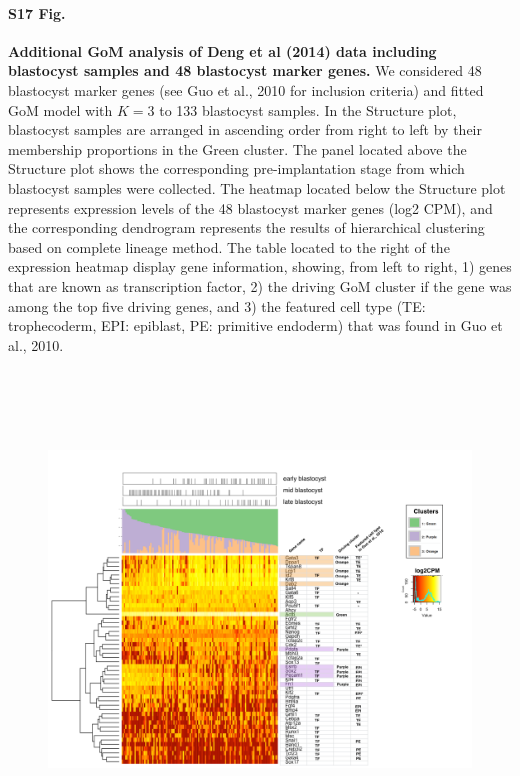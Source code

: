 \documentclass[10pt,letterpaper]{article}
\begin{document}
\paragraph*{S17 Fig.}

\label{figS17}
{\bf Additional GoM analysis of Deng et al (2014) data including blastocyst samples and 48 blastocyst marker genes.} We considered 48 blastocyst marker genes (see Guo et al., 2010 for inclusion criteria) and fitted GoM model with $K = 3$ to 133 blastocyst samples. In the Structure plot, blastocyst samples are arranged in ascending order from right to left by their membership proportions in the Green cluster. The panel located above the Structure plot shows the corresponding pre-implantation stage from which blastocyst samples were collected. The heatmap located below the Structure plot represents expression levels of the 48 blastocyst marker genes (log2 CPM), and the corresponding dendrogram represents the results of hierarchical clustering based on complete lineage method. The table located to the right of the expression heatmap display gene information, showing, from left to right, 1) genes that are known as transcription factor, 2) the driving GoM cluster if the gene was among the top five driving genes, and 3) the featured cell type (TE: trophecoderm, EPI: epiblast, PE: primitive endoderm) that was found in Guo et al., 2010.
\begin{figure}[ht]
\centering
\includegraphics[height=5in, width=6in]{../../src/figure/deng-digging-final.Rmd/deng-structure-combo.png}
\end{figure}
\end{document}
